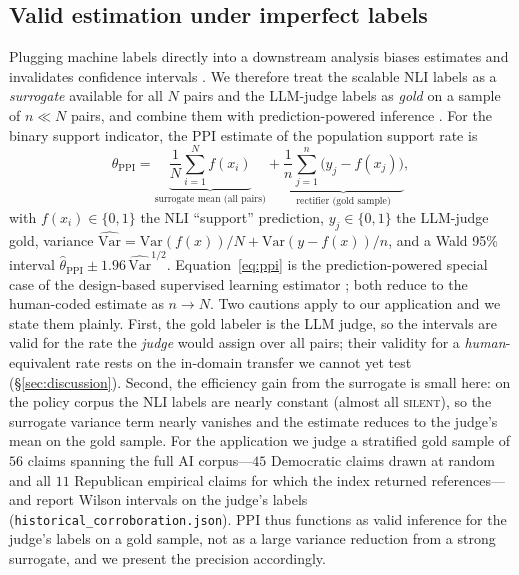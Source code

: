 \subsection{Valid estimation under imperfect labels}
\label{sec:methods-ppi}
Plugging machine labels directly into a downstream analysis biases estimates and invalidates confidence
intervals \citep{egami2023dsl}. We therefore treat the scalable NLI labels as a \emph{surrogate}
available for all $N$ pairs and the LLM-judge labels as \emph{gold} on a sample of $n \ll N$ pairs, and
combine them with prediction-powered inference \citep{angelopoulos2023ppi}. For the binary support
indicator, the PPI estimate of the population support rate is
\begin{equation}
  \hat{\theta}_{\text{PPI}} = \underbrace{\frac{1}{N}\sum_{i=1}^{N} f(x_i)}_{\text{surrogate mean (all pairs)}}
  + \underbrace{\frac{1}{n}\sum_{j=1}^{n}\bigl(y_j - f(x_j)\bigr)}_{\text{rectifier (gold sample)}},
  \label{eq:ppi}
\end{equation}
with $f(x_i)\in\{0,1\}$ the NLI ``support'' prediction, $y_j\in\{0,1\}$ the LLM-judge gold, variance
$\widehat{\mathrm{Var}}=\mathrm{Var}(f(x))/N + \mathrm{Var}(y-f(x))/n$, and a Wald 95\% interval
$\hat{\theta}_{\text{PPI}}\pm 1.96\,\widehat{\mathrm{Var}}^{1/2}$. Equation~\eqref{eq:ppi} is the
prediction-powered special case of the design-based supervised learning estimator \citep{egami2023dsl};
both reduce to the human-coded estimate as $n\to N$. Two cautions apply to our application and we state
them plainly. First, the gold labeler is the LLM judge, so the intervals are valid for the rate the
\emph{judge} would assign over all pairs; their validity for a \emph{human}-equivalent rate rests on the
in-domain transfer we cannot yet test (\S\ref{sec:discussion}). Second, the efficiency gain from the
surrogate is small here: on the policy corpus the NLI labels are nearly constant (almost all
\textsc{silent}), so the surrogate variance term nearly vanishes and the estimate reduces to the judge's
mean on the gold sample. For the application we judge a stratified gold sample of $56$ claims spanning the
full AI corpus---$45$ Democratic claims drawn at random and all $11$ Republican empirical claims for which
the index returned references---and report Wilson intervals on the judge's labels
(\texttt{historical\_corroboration.json}). PPI thus functions as valid inference for the judge's labels on
a gold sample, not as a large variance reduction from a strong surrogate, and we present the precision
accordingly.

